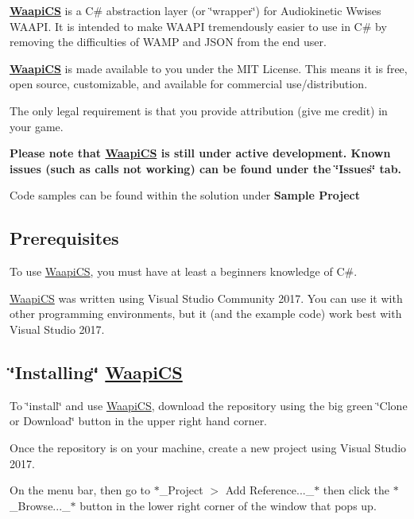 {\bfseries \mbox{\hyperlink{namespace_waapi_c_s}{Waapi\+CS}}} is a C\# abstraction layer (or \char`\"{}wrapper\char`\"{}) for Audiokinetic Wwise\textquotesingle{}s W\+A\+A\+PI. It is intended to make W\+A\+A\+PI tremendously easier to use in C\# by removing the difficulties of W\+A\+MP and J\+S\+ON from the end user.

{\bfseries \mbox{\hyperlink{namespace_waapi_c_s}{Waapi\+CS}}} is made available to you under the M\+IT License. This means it is free, open source, customizable, and available for commercial use/distribution.

The only legal requirement is that you provide attribution (give me credit) in your game.

{\bfseries Please note that \mbox{\hyperlink{namespace_waapi_c_s}{Waapi\+CS}} is still under active development. Known issues (such as calls not working) can be found under the \char`\"{}\+Issues\char`\"{} tab.}

Code samples can be found within the solution under {\bfseries Sample Project}

\subsection*{Prerequisites}

To use \mbox{\hyperlink{namespace_waapi_c_s}{Waapi\+CS}}, you must have at least a beginner\textquotesingle{}s knowledge of C\#.

\mbox{\hyperlink{namespace_waapi_c_s}{Waapi\+CS}} was written using Visual Studio Community 2017. You can use it with other programming environments, but it (and the example code) work best with Visual Studio 2017.

\subsection*{\char`\"{}\+Installing\char`\"{} \mbox{\hyperlink{namespace_waapi_c_s}{Waapi\+CS}}}

To \char`\"{}install\char`\"{} and use \mbox{\hyperlink{namespace_waapi_c_s}{Waapi\+CS}}, download the repository using the big green \char`\"{}\+Clone or Download\char`\"{} button in the upper right hand corner.

Once the repository is on your machine, create a new project using Visual Studio 2017.

On the menu bar, then go to $\ast$\+\_\+\+Project $>$ Add Reference...\+\_\+$\ast$ then click the $\ast$\+\_\+\+Browse...\+\_\+$\ast$ button in the lower right corner of the window that pops up.

